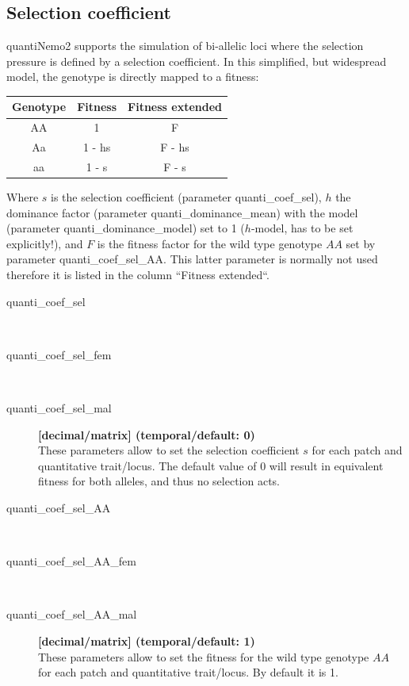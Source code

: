 \documentclass[letterpaper,12pt,oneside]{book}
\begin{document}
\subsection{Selection coefficient}
quantiNemo2 supports the simulation of bi-allelic loci where the selection pressure is defined by a selection coefficient. In this simplified, but widespread model, the genotype is directly mapped to a fitness:\\

\begin{tabular}{ccc}
 \hline            
Genotype & Fitness & Fitness extended \\
\hline
AA & 1 			& F      \\
Aa & 1 - hs & F - hs \\
aa & 1 - s 	& F - s  \\
\hline
\end{tabular}

Where $s$ is the selection coefficient (parameter \textsf{quanti\_coef\_sel}), $h$ the dominance factor (parameter \textsf{quanti\_dominance\_mean}) with the model (parameter \textsf{quanti\_dominance\_model}) set to 1 ($h$-model, has to be set explicitly!), and $F$ is the fitness factor for the wild type genotype $AA$ set by parameter \textsf{quanti\_coef\_sel\_AA}. This latter parameter is normally not used therefore it is listed in the column ``Fitness extended``.
\begin{description}
\item[quanti\_coef\_sel]\hspace*{\fill}\\
\vspace{-9mm}
\item[quanti\_coef\_sel\_fem]\hspace*{\fill}\\
\vspace{-9mm}
\item[quanti\_coef\_sel\_mal]\textbf{[decimal/matrix] (temporal/default: 0)}\\
These parameters allow to set the selection coefficient $s$ for each patch and quantitative trait/locus. The default value of 0 will result in equivalent fitness for both alleles, and thus no selection acts.

\item[quanti\_coef\_sel\_AA]\hspace*{\fill}\\
\vspace{-9mm}
\item[quanti\_coef\_sel\_AA\_fem]\hspace*{\fill}\\
\vspace{-9mm}
\item[quanti\_coef\_sel\_AA\_mal]\textbf{[decimal/matrix] (temporal/default: 1)}\\
These parameters allow to set the fitness for the wild type genotype $AA$ for each patch and quantitative trait/locus. By default it is 1.
\end{description}
\end{document}
